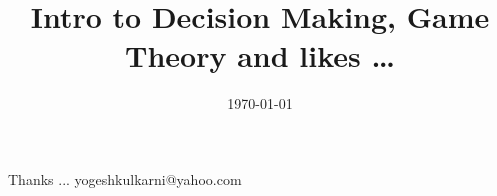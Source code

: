\documentclass[xcolor=dvipsnames,compress,t,pdf]{beamer}
\title[\hspace{4cm} \insertframenumber /\inserttotalframenumber]
{Intro to Decision Making, Game Theory and likes \ldots}
\date[2020]{\today}
\begin{document}
\begin{frame}
\titlepage
\end{frame}





\begin{frame}[c]{}
Thanks ...
\vspace{5mm}
yogeshkulkarni@yahoo.com
\end{frame}
\end{document}
